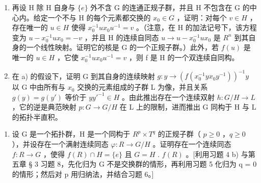 \begin{enumerate}
\def\labelenumi{\alph{enumi})}
\item
  再设 H 除 H 自身与 \(\{e\}\) 外不含 G 的连通正规子群，并且 H 不包含在 G 的中心内。给定一个不与 H 的每个元素都交换的 \(x_{0} \in G\) ，证明：对每个 \(v \in H\) ，存在唯一的 \(u \in H\) 使得 \(x_{0}^{-1}ux_{0}u^{-1} = v\) 。（注意，在 H 的加法记号下，该方程变为 \(u - x_{0}^{-1}ux_{0} = -v\) ，并且 H 的连续自同态 \(u \to u - x_{0}^{-1}ux_{0}\) 是 \(R^{n}\) 到其自身的一个线性映射。证明它的核是 G 的一个正规子群。）此外，若 \(f(u)\) 是唯一的 \(u \in H\) ，它使 \(x_{0}^{-1}ux_{0}u^{-1} = v\) ，则 f 是 H 的一个双连续自同构。
\item
  在 a) 的假设下，证明 G 到其自身的连续映射 \(g: y \to (f(x_{0}^{-1}yx_{0}y^{-1}))^{-1}y\) 以 G 中由所有与 \(x_{0}\) 交换的元素组成的子群 L 为像，并且关系 \(g(y) = g(y')\) 等价于 \(yy'^{-1} \in H\) 。由此推出存在一个连续双射 \(h: G/H \to L\) ，它的逆是典范映射 \(p: G \to G/H\) 在 L 上的限制，进而推出 G 同构于 H 与 L 的拓扑半直积。
\end{enumerate}

\begin{enumerate}
\def\labelenumi{\arabic{enumi})}
\setcounter{enumi}{6}
\tightlist
\item
  设 G 是一个拓扑群，H 是一个同构于 \(R^{p} \times T^{q}\) 的正规子群（ \(p \geqslant 0\) ，\(q \geqslant 0\) ），并设存在一个满射连续同态 \(\varphi: R \to G/H\) 。证明存在一个连续同态 \(f: R \to G\) ，使得 \(f(R) \cap H = \{e\}\) 且 \(G = H\) . \(f(R)\) 。{[}利用习题 4 b) 与第五章 § 3 习题 8，先化归为 G 不是交换群的情形，再利用习题 5 化归为 q = 0 的情形；然后对 p 用归纳法，并结合习题 6。{]}
\end{enumerate}

